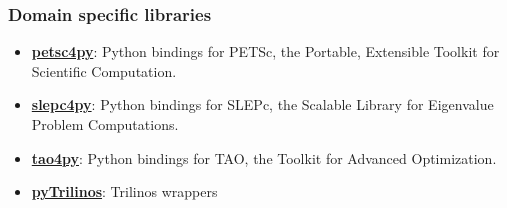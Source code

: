 \documentclass{article}
\begin{document}
\subsubsection{Domain specific
libraries}\label{domain-specific-libraries}

\begin{itemize}
\itemsep1pt\parskip0pt
\item
  \textbf{\href{http://code.google.com/p/petsc4py/}{petsc4py}}: Python
  bindings for PETSc, the Portable, Extensible Toolkit for Scientific
  Computation.
\item
  \textbf{\href{http://slepc4py.googlecode.com/}{slepc4py}}: Python
  bindings for SLEPc, the Scalable Library for Eigenvalue Problem
  Computations.
\item
  \textbf{\href{http://tao4py.googlecode.com/}{tao4py}}: Python bindings
  for TAO, the Toolkit for Advanced Optimization.
\item
  \textbf{\href{http://trilinos.sandia.gov/packages/pytrilinos/}{pyTrilinos}}:
  Trilinos wrappers
\end{itemize}


    
    
    
    
\end{document}
